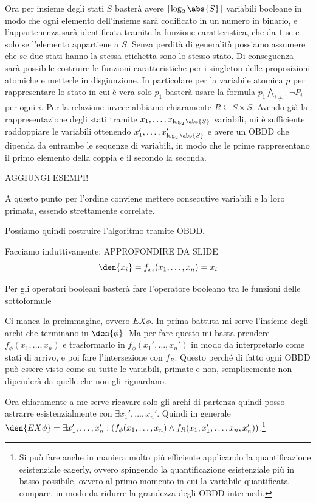 Ora per insieme degli stati \(S\) basterà avere \(\lceil\log_2 \abs{S}\rceil\) variabili booleane in modo che ogni elemento dell'insieme sarà codificato in un numero in binario, e l'appartenenza sarà identificata tramite la funzione caratteristica, che da \(1\) se e solo se l'elemento appartiene a \(S\). Senza perdità di generalità possiamo assumere che se due stati hanno la stessa etichetta sono lo stesso stato. Di conseguenza sarà possibile costruire le funzioni caratteristiche per i singleton delle proposizioni atomiche e metterle in disgiunzione. In particolare per la variabile atomica \(p\) per rappresentare lo stato in cui è vera solo \(p_1\) basterà usare la formula \(p_1 \bigwedge_{i \neq 1} \neg P_i\) per ogni \(i\). Per la relazione invece abbiamo chiaramente \(R\subseteq S\times S\). Avendo già la rappresentazione degli stati tramite \(x_1, \ldots, x_{\log_2\abs{S}}\) variabili, mi è sufficiente raddoppiare le variabili ottenendo \(x_1', \ldots, x_{\log_2\abs{S}}'\) e avere un OBDD che dipenda da entrambe le sequenze di variabili, in modo che le prime rappresentano il primo elemento della coppia e il secondo la seconda.

AGGIUNGI ESEMPI!

A questo punto per l'ordine conviene mettere consecutive variabili e la loro primata, essendo strettamente correlate.

Possiamo quindi costruire l'algoritmo tramite OBDD\@.

Facciamo induttivamente:
APPROFONDIRE DA SLIDE
\[\den{x_i} = f_{x_i}(x_1, \ldots, x_{n}) = x_i\]

Per gli operatori booleani basterà fare l'operatore booleano tra le funzioni delle sottoformule

Ci manca la preimmagine, ovvero \(EX\phi\). In prima battuta mi serve l'insieme degli archi che terminano in \(\den{\phi}\). Ma per fare questo mi basta prendere \(f_{\phi}(x_1,\ldots,x_n)\) e trasformarlo in \(f_{\phi}(x_1', \ldots, x_n')\) in modo da interpretarlo come stati di arrivo, e poi fare l'intersezione con \(f_{R}\). Questo perché di fatto ogni OBDD può essere visto come su tutte le variabili, primate e non, semplicemente non dipenderà da quelle che non gli riguardano.

Ora chiaramente a me serve ricavare solo gli archi di partenza quindi posso astrarre esistenzialmente con \(\exists x_1', \ldots,x_n'\). Quindi in generale \(\den{EX\phi}= \exists x_1',\ldots,x_n': (f_{\phi}(x_1,\ldots,x_n)\land f_{R}(x_1,x_1',\ldots,x_n,x_n'))\).\footnote{Si può fare anche in maniera molto più efficiente applicando la quantificazione esistenziale eagerly, ovvero spingendo la quantificazione esistenziale più in basso possibile, ovvero al primo momento in cui la variabile quantificata compare, in modo da ridurre la grandezza degli OBDD intermedi.}

